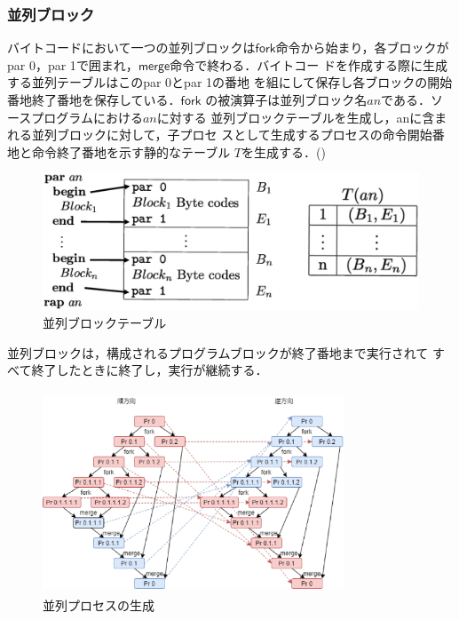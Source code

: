 \documentclass[submit,PRO]{ipsj}
\newcommand{\bcode}[1]{$\mathsf{#1}$}
\begin{document}
\subsubsection{並列ブロック}

バイトコードにおいて一つの並列ブロックは\bcode{fork}命令から始まり，各ブロックが
{\sf par 0}，{\sf par 1}で囲まれ，\bcode{merge}命令で終わる．バイトコー
ドを作成する際に生成する並列テーブルはこの{\sf par 0}と{\sf par 1}の番地
を組にして保存し各ブロックの開始番地終了番地を保存している．\bcode{fork}
の被演算子は並列ブロック名$an$である．ソースプログラムにおける$an$に対する
並列ブロックテーブルを生成し，anに含まれる並列ブロックに対して，子プロセ
スとして生成するプロセスの命令開始番地と命令終了番地を示す静的なテーブル
$T$を生成する．()

\begin{figure}[tb]
\includegraphics[width=.8\linewidth]{./parallelTable_1.eps}
\caption{並列ブロックテーブル}
\label{fig:parallelTable}
\end{figure}

並列ブロックは，構成されるプログラムブロックが終了番地まで実行されて
すべて終了したときに終了し，実行が継続する．

\begin{figure}[tb]
\includegraphics[height=6.0cm,width=9.0cm]{./parallel.eps}
\caption{並列プロセスの生成}
\label{fig:parallel}
\end{figure}
\end{document}
